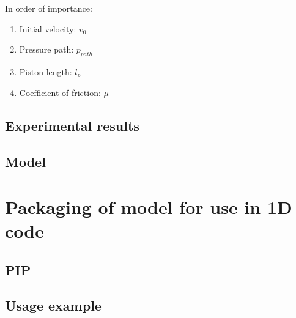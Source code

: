 \documentclass{article}
\begin{document}
In order of importance:
\begin{enumerate}
	\item Initial velocity: $v_{0}$
	\item Pressure path: $p_{path}$
	\item Piston length: $l_{p}$
	\item Coefficient of friction: $\mu$
\end{enumerate}

\subsection{Experimental results}

\subsection{Model}

\section{Packaging of model for use in 1D code}

\subsection{PIP}

\subsection{Usage example}


	\printbibliography
\end{document}
